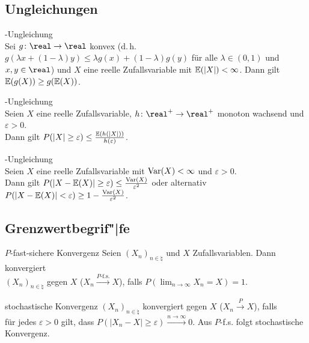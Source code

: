 \subsection{%
    Ungleichungen%
}

\begin{Def}{-Ungleichung}\\
    Sei $g\colon \real \rightarrow \real$ konvex
    (d.\,h. $g(\lambda x + (1-\lambda) y) \le \lambda g(x) + (1-\lambda) g(y)$
    für alle $\lambda \in (0, 1)$ und $x, y \in \real$) und
    $X$ eine reelle Zufallsvariable mit $\mathbb{E}(|X|) < \infty$.
    Dann gilt $\mathbb{E}(g(X)) \ge g(\mathbb{E}(X))$.
\end{Def}

\begin{Def}{-Ungleichung}\\
    Seien $X$ eine reelle Zufallsvariable, $h\colon \real^+ \rightarrow \real^+$
    monoton wachsend und $\varepsilon > 0$.\\
    Dann gilt $P(|X| \ge \varepsilon) \le \frac{\mathbb{E}(h(|X|))}{h(\varepsilon)}$.
\end{Def}

\begin{Def}{-Ungleichung}\\
    Seien $X$ eine reelle Zufallsvariable mit $\mathrm{Var}(X) < \infty$
    und $\varepsilon > 0$.\\
    Dann gilt $P(|X - \mathbb{E}(X)| \ge \varepsilon) \le \frac{\mathrm{Var}(X)}{\varepsilon^2}$ oder alternativ
    $P(|X - \mathbb{E}(X)| < \varepsilon) \ge 1 - \frac{\mathrm{Var}(X)}{\varepsilon^2}$.
\end{Def}

\subsection{%
    Grenzwertbegrif"|fe%
}

\begin{Def}{$P$-fast-sichere Konvergenz}
    Seien $(X_n)_{n \in \natural}$ und $X$ Zufallsvariablen.
    Dann konvergiert\\
    $(X_n)_{n \in \natural}$  gegen $X$
    ($X_n \xrightarrow{P\text{-f.s.}} X$),
    falls $P(\lim_{n \to \infty} X_n = X) = 1$.
\end{Def}

\begin{Def}{stochastische Konvergenz}
    $(X_n)_{n \in \natural}$ konvergiert  gegen $X$
    ($X_n \xrightarrow{P} X$), falls\\
    für jedes $\varepsilon > 0$ gilt, dass
    $P(|X_n - X| \ge \varepsilon) \xrightarrow{n \to \infty} 0$.
    Aus $P$-f.s. folgt stochastische Konvergenz.
\end{Def}

